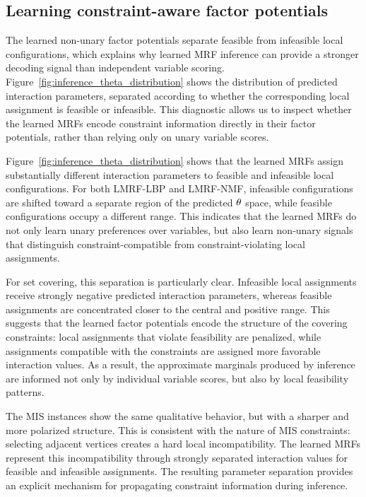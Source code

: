 \subsection{Learning constraint-aware factor potentials}

The learned non-unary factor potentials separate feasible from infeasible local configurations, which explains why learned MRF inference can provide a stronger decoding signal than independent variable scoring. Figure~\ref{fig:inference_theta_distribution} shows the distribution of predicted interaction parameters, separated according to whether the corresponding local assignment is feasible or infeasible. This diagnostic allows us to inspect whether the learned MRFs encode constraint information directly in their factor potentials, rather than relying only on unary variable scores.



Figure~\ref{fig:inference_theta_distribution} shows that the learned MRFs assign substantially different interaction parameters to feasible and infeasible local configurations. For both LMRF-LBP and LMRF-NMF, infeasible configurations are shifted toward a separate region of the predicted $\theta$ space, while feasible configurations occupy a different range. This indicates that the learned MRFs do not only learn unary preferences over variables, but also learn non-unary signals that distinguish constraint-compatible from constraint-violating local assignments.

For set covering, this separation is particularly clear. Infeasible local assignments receive strongly negative predicted interaction parameters, whereas feasible assignments are concentrated closer to the central and positive range. This suggests that the learned factor potentials encode the structure of the covering constraints: local assignments that violate feasibility are penalized, while assignments compatible with the constraints are assigned more favorable interaction values. As a result, the approximate marginals produced by inference are informed not only by individual variable scores, but also by local feasibility patterns.

The MIS instances show the same qualitative behavior, but with a sharper and more polarized structure. This is consistent with the nature of MIS constraints: selecting adjacent vertices creates a hard local incompatibility. The learned MRFs represent this incompatibility through strongly separated interaction values for feasible and infeasible assignments. The resulting parameter separation provides an explicit mechanism for propagating constraint information during inference.

